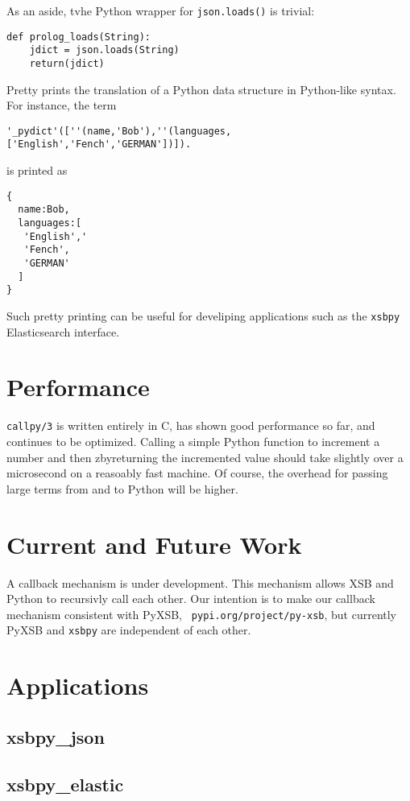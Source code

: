 \begin{description}
As an aside, tvhe Python wrapper for {\tt json.loads()} is trivial:
\begin{verbatim}
def prolog_loads(String):
    jdict = json.loads(String)
    return(jdict)
\end{verbatim}


Pretty prints the translation of a Python data structure in
Python-like syntax.  For instance, the term

\begin{verbatim}
'_pydict'([''(name,'Bob'),''(languages,['English','Fench','GERMAN'])]).
\end{verbatim}

\noindent
is printed as 
\begin{verbatim}
{
  name:Bob,
  languages:[
   'English','
   'Fench',
   'GERMAN'
  ]
}
\end{verbatim}

Such pretty printing can be useful for develiping applications such as
the {\tt xsbpy} Elasticsearch interface.


\end{description}

\section{Performance}

{\tt callpy/3} is written entirely in C, has shown good performance so
far, and continues to be optimized.  Calling a simple Python function
to increment a number and then zbyreturning the incremented value should
take slightly over a microsecond on a reasoably fast machine.  Of
course, the overhead for passing large terms from and to Python will
be higher.

\section{Current and Future Work}

A callback mechanism is under development.  This mechanism allows XSB
and Python to recursivly call each other.  Our intention is to make
our callback mechanism consistent with PyXSB, {\tt
  pypi.org/project/py-xsb}, but currently PyXSB and {\tt xsbpy} are
independent of each other.


\section{Applications}

\subsection{xsbpy\_json}

\subsection{xsbpy\_elastic}
